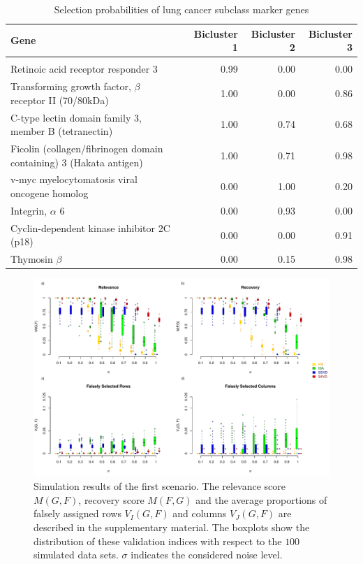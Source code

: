 \begin{flushleft}
 \begin{table}[t]
\caption{Selection probabilities of lung cancer subclass marker genes \label{Tab:01}}
{\begin{tabular}{lrrrr} \hline
Gene & \hspace{4 cm} & Bicluster 1 & Bicluster 2 & Bicluster 3 \\[4pt] 
\hline\\[-4pt]
Retinoic acid receptor responder 3 & & 0.99 & 0.00 & 0.00 \\ 
Transforming growth factor, $\beta$ receptor II (70/80kDa) & & 1.00 & 0.00 & 0.86 \\ 
C-type lectin domain family 3, member B (tetranectin) & & 1.00 & 0.74 & 0.68 \\ 
Ficolin (collagen/fibrinogen domain containing) 3 (Hakata antigen) & &1.00 & 0.71 & 0.98 \\ 
v-myc myelocytomatosis viral oncogene homolog & &0.00 & 1.00 & 0.20 \\ 
Integrin, $\alpha$ 6 & &0.00 & 0.93 & 0.00 \\ 
Cyclin-dependent kinase inhibitor 2C (p18) & &0.00 & 0.00 & 0.91 \\ 
Thymosin $\beta$ & &0.00 & 0.15 & 0.98 \\   
\hline
\end{tabular}}{}%
\end{table}
\end{flushleft}

\begin{center}
\begin{figure}[t]
\includegraphics[width=145 mm]{./Bilder/scenario1.pdf}
\caption{ Simulation results of the first scenario. The relevance score $M(G,F)$, recovery score $M(F,G)$ and the average proportions of falsely assigned rows $V_{I}(G,F)$ and columns $V_{J}(G,F)$ are described in the supplementary material. The boxplots show the distribution of these validation indices with respect to the $100$ simulated data sets. $\sigma$ indicates the considered noise level.\label{fig:02} 
}
\end{figure}
\end{center}

